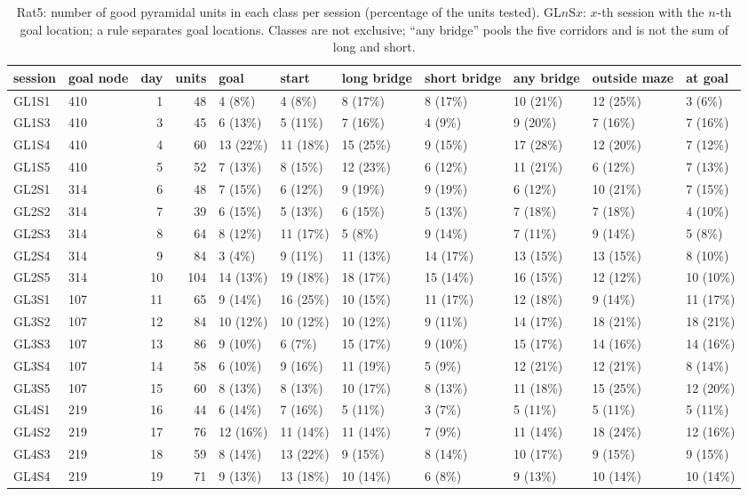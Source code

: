 \begin{table}[htbp]
\centering
\scriptsize
\caption{Rat5: number of good pyramidal units in each class per session (percentage of the units tested). GL$n$S$x$: $x$-th session with the $n$-th goal location; a rule separates goal locations. Classes are not exclusive; ``any bridge'' pools the five corridors and is not the sum of long and short.}
\label{tab:cell_classes:Rat5}
\begin{tabular}{llrrlllllll}
\toprule
session & goal node & day & units & goal & start & long bridge & short bridge & any bridge & outside maze & at goal \\
\midrule
GL1S1 & 410 & 1 & 48 & 4 (8\%) & 4 (8\%) & 8 (17\%) & 8 (17\%) & 10 (21\%) & 12 (25\%) & 3 (6\%) \\
GL1S3 & 410 & 3 & 45 & 6 (13\%) & 5 (11\%) & 7 (16\%) & 4 (9\%) & 9 (20\%) & 7 (16\%) & 7 (16\%) \\
GL1S4 & 410 & 4 & 60 & 13 (22\%) & 11 (18\%) & 15 (25\%) & 9 (15\%) & 17 (28\%) & 12 (20\%) & 7 (12\%) \\
GL1S5 & 410 & 5 & 52 & 7 (13\%) & 8 (15\%) & 12 (23\%) & 6 (12\%) & 11 (21\%) & 6 (12\%) & 7 (13\%) \\
\midrule
GL2S1 & 314 & 6 & 48 & 7 (15\%) & 6 (12\%) & 9 (19\%) & 9 (19\%) & 6 (12\%) & 10 (21\%) & 7 (15\%) \\
GL2S2 & 314 & 7 & 39 & 6 (15\%) & 5 (13\%) & 6 (15\%) & 5 (13\%) & 7 (18\%) & 7 (18\%) & 4 (10\%) \\
GL2S3 & 314 & 8 & 64 & 8 (12\%) & 11 (17\%) & 5 (8\%) & 9 (14\%) & 7 (11\%) & 9 (14\%) & 5 (8\%) \\
GL2S4 & 314 & 9 & 84 & 3 (4\%) & 9 (11\%) & 11 (13\%) & 14 (17\%) & 13 (15\%) & 13 (15\%) & 8 (10\%) \\
GL2S5 & 314 & 10 & 104 & 14 (13\%) & 19 (18\%) & 18 (17\%) & 15 (14\%) & 16 (15\%) & 12 (12\%) & 10 (10\%) \\
\midrule
GL3S1 & 107 & 11 & 65 & 9 (14\%) & 16 (25\%) & 10 (15\%) & 11 (17\%) & 12 (18\%) & 9 (14\%) & 11 (17\%) \\
GL3S2 & 107 & 12 & 84 & 10 (12\%) & 10 (12\%) & 10 (12\%) & 9 (11\%) & 14 (17\%) & 18 (21\%) & 18 (21\%) \\
GL3S3 & 107 & 13 & 86 & 9 (10\%) & 6 (7\%) & 15 (17\%) & 9 (10\%) & 15 (17\%) & 14 (16\%) & 14 (16\%) \\
GL3S4 & 107 & 14 & 58 & 6 (10\%) & 9 (16\%) & 11 (19\%) & 5 (9\%) & 12 (21\%) & 12 (21\%) & 8 (14\%) \\
GL3S5 & 107 & 15 & 60 & 8 (13\%) & 8 (13\%) & 10 (17\%) & 8 (13\%) & 11 (18\%) & 15 (25\%) & 12 (20\%) \\
\midrule
GL4S1 & 219 & 16 & 44 & 6 (14\%) & 7 (16\%) & 5 (11\%) & 3 (7\%) & 5 (11\%) & 5 (11\%) & 5 (11\%) \\
GL4S2 & 219 & 17 & 76 & 12 (16\%) & 11 (14\%) & 11 (14\%) & 7 (9\%) & 11 (14\%) & 18 (24\%) & 12 (16\%) \\
GL4S3 & 219 & 18 & 59 & 8 (14\%) & 13 (22\%) & 9 (15\%) & 8 (14\%) & 10 (17\%) & 9 (15\%) & 9 (15\%) \\
GL4S4 & 219 & 19 & 71 & 9 (13\%) & 13 (18\%) & 10 (14\%) & 6 (8\%) & 9 (13\%) & 10 (14\%) & 10 (14\%) \\
\bottomrule
\end{tabular}
\end{table}
